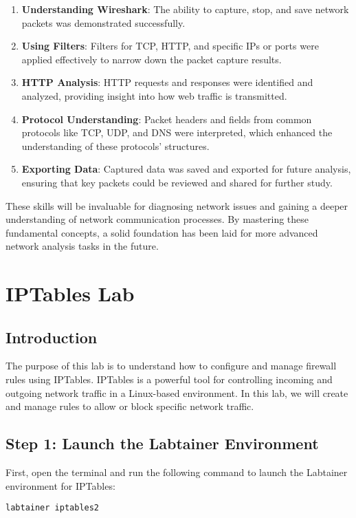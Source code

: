 \documentclass[a4paper,12pt]{article} %
\begin{document}
\begin{enumerate}
    \item \textbf{Understanding Wireshark}: The ability to capture, stop, and save network packets was demonstrated successfully.
    \item \textbf{Using Filters}: Filters for TCP, HTTP, and specific IPs or ports were applied effectively to narrow down the packet capture results.
    \item \textbf{HTTP Analysis}: HTTP requests and responses were identified and analyzed, providing insight into how web traffic is transmitted.
    \item \textbf{Protocol Understanding}: Packet headers and fields from common protocols like TCP, UDP, and DNS were interpreted, which enhanced the understanding of these protocols' structures.
    \item \textbf{Exporting Data}: Captured data was saved and exported for future analysis, ensuring that key packets could be reviewed and shared for further study.
\end{enumerate}

These skills will be invaluable for diagnosing network issues and gaining a deeper understanding of network communication processes. By mastering these fundamental concepts, a solid foundation has been laid for more advanced network analysis tasks in the future.

\newpage
\section*{IPTables Lab}

\subsection*{Introduction}
The purpose of this lab is to understand how to configure and manage firewall rules using IPTables. IPTables is a powerful tool for controlling incoming and outgoing network traffic in a Linux-based environment. In this lab, we will create and manage rules to allow or block specific network traffic.

\subsection*{Step 1: Launch the Labtainer Environment}
First, open the terminal and run the following command to launch the Labtainer environment for IPTables:

\begin{verbatim}
labtainer iptables2
\end{verbatim}
\end{document}
